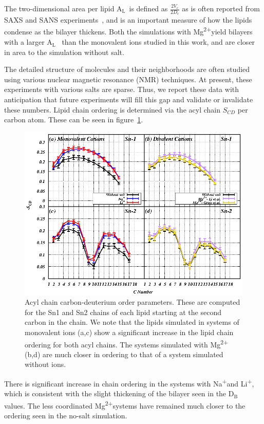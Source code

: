 \documentclass[12pt,openany,final]{book}
\newcommand{\db}{$\text{D}_\text{B}$}
\newcommand{\al}{$\text{A}_{\text{L}}$}
\newcommand{\na}{Na\textsuperscript{+}}
\newcommand{\mg}{Mg\textsuperscript{2+}}
\begin{document}
The two-dimensional area per lipid \al~is defined as
{$\frac{2V_c}{2D_c}$ as is often reported from SAXS and SANS experiments~\cite{nagle:2000}, and is an important
measure of how the lipids condense as the bilayer thickens.}
{Both the simulations with \mg yield bilayers with a larger \al~ 
    than the monovalent ions studied in this work, and are closer
in area to the simulation without salt.
}

The detailed structure of molecules and their neighborhoods are often studied using 
various nuclear magnetic resonance (NMR) techniques.
{At present, these experiments with various salts are sparse.}
{Thus,} we report these data with anticipation that future experiments will fill this gap and validate
or invalidate
these numbers.
Lipid chain ordering is determined via the acyl chain $S_{CD}$ per carbon
atom. These can be seen in figure~\ref{fig:op:ch2}. 
\begin{figure}
    \caption[Acyl-chain order parameters]{Acyl chain carbon-deuterium order parameters. These are computed for the Sn1 and Sn2 chains of each lipid starting at the 
        second carbon in the chain\cite{egberts:1988,Douliez:1995}. We note that the lipids simulated in systems of monovalent ions (a,c) show a significant increase
in the lipid chain ordering for both acyl chains. The systems simulated with \mg (b,d) are much closer in ordering to that of a system
simulated without ions.}
    \label{fig:op:ch2}
    \includegraphics{Figure_2_ch2.eps}
\end{figure}

There is significant increase in chain ordering in the systems 
with \na and Li\textsuperscript{+}, which {is} consistent with the slight thickening
of the bilayer seen in the \db~ values. The less coordinated \mg systems have remained much closer to the 
ordering seen in the no-salt simulation.
\end{document}
